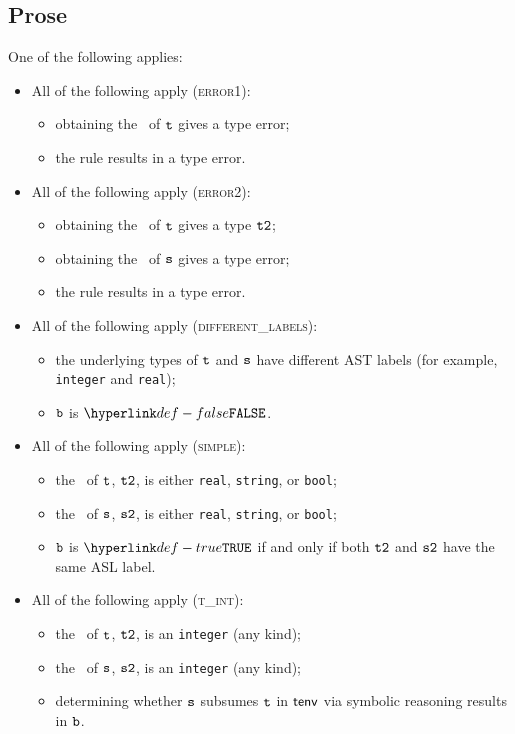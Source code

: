 \subsection{Prose}
One of the following applies:
\begin{itemize}
\item All of the following apply (\textsc{error1}):
  \begin{itemize}
  \item obtaining the \underlyingtype\ of $\texttt{t}$ gives a type error;
  \item the rule results in a type error.
  \end{itemize}

\item All of the following apply (\textsc{error2}):
  \begin{itemize}
    \item obtaining the \underlyingtype\ of $\texttt{t}$ gives a type $\texttt{t2}$;
    \item obtaining the \underlyingtype\ of $\texttt{s}$ gives a type error;
    \item the rule results in a type error.
    \end{itemize}

\item All of the following apply (\textsc{different\_labels}):
  \begin{itemize}
  \item the underlying types of $\texttt{t}$ and $\texttt{s}$ have different AST labels
  (for example, \texttt{integer} and \texttt{real});
  \item $\texttt{b}$ is $\False$.
  \end{itemize}

\item All of the following apply (\textsc{simple}):
  \begin{itemize}
  \item the \underlyingtype\ of $\texttt{t}$, $\texttt{t2}$, is either \texttt{real}, \texttt{string}, or \texttt{bool};
  \item the \underlyingtype\ of $\texttt{s}$, $\texttt{s2}$, is either \texttt{real}, \texttt{string}, or \texttt{bool};
  \item $\texttt{b}$ is $\True$ if and only if both $\texttt{t2}$ and $\texttt{s2}$ have the same ASL label.
  \end{itemize}

\item All of the following apply (\textsc{t\_int}):
  \begin{itemize}
  \item the \underlyingtype\ of $\texttt{t}$, $\texttt{t2}$, is an \texttt{integer} (any kind);
  \item the \underlyingtype\ of $\texttt{s}$, $\texttt{s2}$, is an \texttt{integer} (any kind);
  \item determining whether $\texttt{s}$ subsumes $\texttt{t}$ in $\textsf{tenv}$ via symbolic reasoning results in $\texttt{b}$.
  \end{itemize}


\end{itemize}
